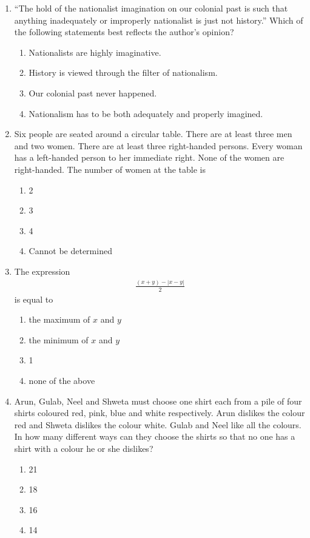 \documentclass[journal,12pt,onecolumn]{IEEEtran}
\theoremstyle{remark}
\begin{document}
\begin{enumerate}
\item ``The hold of the nationalist imagination on our colonial past is such that anything inadequately or improperly nationalist is just not history.''  
Which of the following statements best reflects the author's opinion?
\begin{multicols}{2}
\begin{enumerate}
\item Nationalists are highly imaginative.  
\item History is viewed through the filter of nationalism.  
\item Our colonial past never happened.  
\item Nationalism has to be both adequately and properly imagined.  
\end{enumerate}
\end{multicols}


\item Six people are seated around a circular table. There are at least three men and two women. There are at least three right-handed persons.  
Every woman has a left-handed person to her immediate right. None of the women are right-handed.  
The number of women at the table is
\begin{multicols}{2}
\begin{enumerate}
\item 2  
\item 3  
\item 4  
\item Cannot be determined  
\end{enumerate}
\end{multicols}


\item The expression 
\begin{align*}
\frac{(x+y) - |x-y|}{2}
\end{align*}
is equal to
\begin{multicols}{2}
\begin{enumerate}
\item the maximum of $x$ and $y$  
\item the minimum of $x$ and $y$  
\item 1  
\item none of the above  
\end{enumerate}
\end{multicols}


\item Arun, Gulab, Neel and Shweta must choose one shirt each from a pile of four shirts coloured red, pink, blue and white respectively.  
Arun dislikes the colour red and Shweta dislikes the colour white.  
Gulab and Neel like all the colours.  
In how many different ways can they choose the shirts so that no one has a shirt with a colour he or she dislikes?
\begin{multicols}{2}
\begin{enumerate}
\item 21  
\item 18  
\item 16  
\item 14  
\end{enumerate}
\end{multicols}



\end{enumerate}
\end{document}
